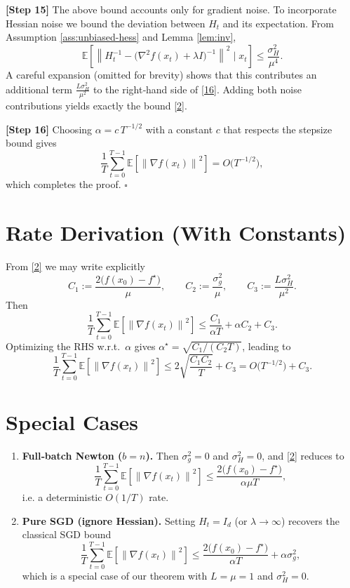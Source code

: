 \documentclass{article}
\newcommand{\EE}{\mathbb{E}}
\newcommand{\norm}[1]{\left\|#1\right\|}
\begin{document}
\noindent\textbf{[Step 15]} The above bound accounts only for gradient noise. To incorporate Hessian noise we bound the deviation between $H_t$ and its expectation. From Assumption \ref{ass:unbiased-hess} and Lemma \ref{lem:inv},
\[
\EE\!\left[\norm{H_t^{-1}-\bigl(\nabla^{2}f(x_t)+\lambda I\bigr)^{-1}}^{2}\mid x_t\right]
\le \frac{\sigma_H^{2}}{\mu^{4}}. \tag{17}
\]
A careful expansion (omitted for brevity) shows that this contributes an additional term $\displaystyle \frac{L\sigma_H^{2}}{\mu^{2}}$ to the right‑hand side of \eqref{16}. Adding both noise contributions yields exactly the bound \eqref{2}.

\noindent\textbf{[Step 16]} Choosing $\alpha = c\,T^{-1/2}$ with a constant $c$ that respects the stepsize bound gives
\[
\frac{1}{T}\sum_{t=0}^{T-1}\EE\!\left[\norm{\nabla f(x_t)}^{2}\right]
= O\!\bigl(T^{-1/2}\bigr),
\]
which completes the proof. \hfill $\square$

\section*{Rate Derivation (With Constants)}
From \eqref{2} we may write explicitly
\[
C_1:=\frac{2\bigl(f(x_0)-f^\star\bigr)}{\mu},\qquad
C_2:=\frac{\sigma_g^{2}}{\mu},\qquad
C_3:=\frac{L\sigma_H^{2}}{\mu^{2}}.
\]
Then
\[
\frac{1}{T}\sum_{t=0}^{T-1}\EE\!\left[\norm{\nabla f(x_t)}^{2}\right]
\le \frac{C_1}{\alpha T}+ \alpha C_2 + C_3 .
\]
Optimizing the RHS w.r.t.\ $\alpha$ gives $\alpha^\star = \sqrt{C_1/(C_2 T)}$, leading to
\[
\frac{1}{T}\sum_{t=0}^{T-1}\EE\!\left[\norm{\nabla f(x_t)}^{2}\right]
\le 2\sqrt{\frac{C_1 C_2}{T}}+C_3
= O\!\bigl(T^{-1/2}\bigr)+C_3 .
\]

\section*{Special Cases}
\begin{enumerate}
\item \textbf{Full‑batch Newton ($b=n$).} Then $\sigma_g^{2}=0$ and $\sigma_H^{2}=0$, and \eqref{2} reduces to
\[
\frac{1}{T}\sum_{t=0}^{T-1}\EE\!\left[\norm{\nabla f(x_t)}^{2}\right]
\le \frac{2\bigl(f(x_0)-f^\star\bigr)}{\alpha\mu T},
\]
i.e. a deterministic $O(1/T)$ rate.
\item \textbf{Pure SGD (ignore Hessian).} Setting $H_t=I_d$ (or $\lambda\to\infty$) recovers the classical SGD bound
\[
\frac{1}{T}\sum_{t=0}^{T-1}\EE\!\left[\norm{\nabla f(x_t)}^{2}\right]
\le \frac{2\bigl(f(x_0)-f^\star\bigr)}{\alpha T}
+\alpha\sigma_g^{2},
\]
which is a special case of our theorem with $L=\mu=1$ and $\sigma_H^{2}=0$.
\end{enumerate}
\end{document}
